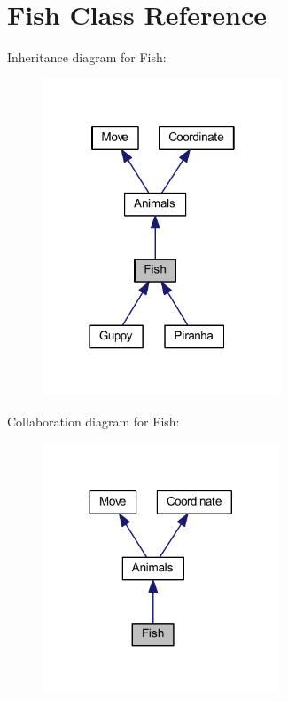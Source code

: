 \hypertarget{class_fish}{}\section{Fish Class Reference}
\label{class_fish}


Inheritance diagram for Fish\+:
\nopagebreak
\begin{figure}[H]
\begin{center}
\leavevmode
\includegraphics[width=202pt]{class_fish__inherit__graph}
\end{center}
\end{figure}


Collaboration diagram for Fish\+:
\nopagebreak
\begin{figure}[H]
\begin{center}
\leavevmode
\includegraphics[width=200pt]{class_fish__coll__graph}
\end{center}
\end{figure}
